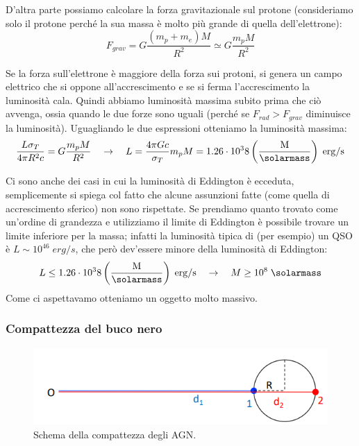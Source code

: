 D’altra parte possiamo calcolare la forza gravitazionale sul protone (consideriamo solo il protone perché la sua massa è molto più grande di quella dell'elettrone):
\begin{equation*}
    F_{grav} = G\frac{(m_p+m_e)M}{R^2} \simeq G\frac{m_pM}{R^2}
\end{equation*}

Se la forza sull’elettrone è maggiore della forza sui protoni, si genera un campo elettrico che si oppone all’accrescimento e se si ferma l’accrescimento la luminosità cala. Quindi abbiamo luminosità massima subito prima che ciò avvenga, ossia quando le due forze sono uguali (perché se $F_{rad} > F_{grav}$ diminuisce la luminosità). Uguagliando le due espressioni otteniamo la luminosità massima:
\begin{equation*}
    \frac{L\sigma_T}{4\pi R^2 c} =  G\frac{m_pM}{R^2} \quad \rightarrow \quad L = \frac{4\pi G c}{\sigma_T}m_pM = 1.26\cdot 10^38 \left(\frac{\textup{M}}{\si{\solarmass}}\right)\;\si{erg}/\si{s}
\end{equation*}

Ci sono anche dei casi in cui la luminosità di Eddington è ecceduta, semplicemente si spiega col fatto che alcune assunzioni fatte (come quella di accrescimento sferico) non sono rispettate. Se prendiamo quanto trovato come un'ordine di grandezza e utilizziamo il limite di Eddington è possibile trovare un limite inferiore per la massa; infatti la luminosità tipica di (per esempio) un QSO è $L\sim 10^{46} \;\si{erg}/\si{s}$, che però dev'essere minore della luminosità di Eddington:
\begin{equation*}
    L \leq 1.26\cdot 10^38 \left(\frac{\textup{M}}{\si{\solarmass}}\right)\;\si{erg}/\si{s} \quad \rightarrow \quad M \geq 10^8 \;\si{\solarmass}
\end{equation*}
Come ci aspettavamo otteniamo un oggetto molto massivo. 

\subsubsection{Compattezza del buco nero}

\begin{figure}
    \centering
    \includegraphics[width = 0.7 \textwidth]{immagini/compattezza-agn.png}
    \caption{Schema della compattezza degli AGN.}
    \label{fig:compattezza-agn}
\end{figure}

